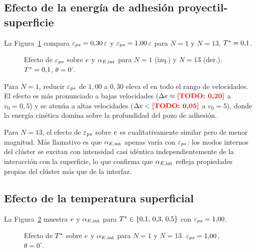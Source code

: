 \subsection{Efecto de la energía de adhesión proyectil-superficie}
\label{sec:eps_ps}

La Figura~\ref{fig:eps} compara $\varepsilon_{ps} = 0{,}30\,\varepsilon$ y
$\varepsilon_{ps} = 1{,}00\,\varepsilon$ para $N=1$ y $N=13$, $T^{*}=0{,}1$.

\begin{figure}[ht]
    \centering
    \caption{Efecto de $\varepsilon_{ps}$ sobre $e$ y $\alpha_{E,\mathrm{int}}$ para $N=1$ (izq.)
    y $N=13$ (der.). $T^{*}=0{,}1$, $\theta=0^\circ$.}
    \label{fig:eps}
\end{figure}

Para $N=1$, reducir $\varepsilon_{ps}$ de $1{,}00$ a $0{,}30$ eleva el \COR{} en todo
el rango de velocidades. El efecto es más pronunciado a bajas velocidades
($\Delta e \approx \textcolor{red}{\textbf{[TODO: 0{,}20]}}$ a $v_0=0{,}5$) y se atenúa a altas
velocidades ($\Delta e < \textcolor{red}{\textbf{[TODO: 0{,}05]}}$ a $v_0 = 5$), donde la energía
cinética domina sobre la profundidad del pozo de adhesión.

Para $N=13$, el efecto de $\varepsilon_{ps}$ sobre $e$ es cualitativamente similar
pero de menor magnitud. Más llamativo es que $\alpha_{E,\mathrm{int}}$ apenas varía con
$\varepsilon_{ps}$: los modos internos del clúster se excitan con intensidad casi
idéntica independientemente de la interacción con la superficie, lo que confirma
que $\alpha_{E,\mathrm{int}}$ refleja propiedades propias del clúster más que de la interfaz.

\subsection{Efecto de la temperatura superficial}
\label{sec:temperatura}

La Figura~\ref{fig:temperatura} muestra $e$ y $\alpha_{E,\mathrm{int}}$ para
$T^{*} \in \{0{,}1,\, 0{,}3,\, 0{,}5\}$ con $\varepsilon_{ps} = 1{,}00$.

\begin{figure}[ht]
    \centering
    \caption{Efecto de $T^{*}$ sobre $e$ y $\alpha_{E,\mathrm{int}}$ para $N=1$ y $N=13$.
    $\varepsilon_{ps}=1{,}00$, $\theta=0^\circ$.}
    \label{fig:temperatura}
\end{figure}

